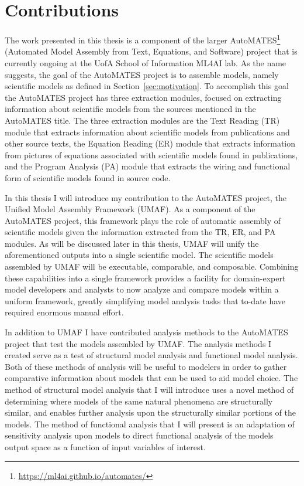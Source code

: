 \section{Contributions\label{sec:contributions}}
The work presented in this thesis is a component of the larger AutoMATES\footnote{\url{https://ml4ai.github.io/automates/}} (Automated Model Assembly from Text, Equations, and Software) project \citep{pyarelal2019} that is currently ongoing at the UofA School of Information ML4AI lab.
As the name suggests, the goal of the AutoMATES project is to assemble models, namely scientific models as defined in Section~\ref{sec:motivation}.
To accomplish this goal the AutoMATES project has three extraction modules, focused on extracting information about scientific models from the sources mentioned in the AutoMATES title.
The three extraction modules are the Text Reading (TR) module that extracts information about scientific models from publications and other source texts, the Equation Reading (ER) module that extracts information from pictures of equations associated with scientific models found in publications, and the Program Analysis (PA) module that extracts the wiring and functional form of scientific models found in source code.

In this thesis I will introduce my contribution to the AutoMATES project, the Unified Model Assembly Framework (UMAF).
As a component of the AutoMATES project, this framework plays the role of automatic assembly of scientific models given the information extracted from the TR, ER, and PA modules.
As will be discussed later in this thesis, UMAF will unify the aforementioned outputs into a single scientific model.
The scientific models assembled by UMAF will be executable, comparable, and composable.
Combining these capabilities into a single framework provides a facility for domain-expert model developers and analysts to now analyze and compare models within a uniform framework, greatly simplifying model analysis tasks that to-date have required enormous manual effort.

In addition to UMAF I have contributed analysis methods to the AutoMATES project that test the models assembled by UMAF.
The analysis methods I created serve as a test of structural model analysis and functional model analysis.
Both of these methods of analysis will be useful to modelers in order to gather comparative information about models that can be used to aid model choice.
The method of structural model analysis that I will introduce uses a novel method of determining where models of the same natural phenomena are structurally similar, and enables further analysis upon the structurally similar portions of the models.
The method of functional analysis that I will present is an adaptation of sensitivity analysis upon models to direct functional analysis of the models output space as a function of input variables of interest.


